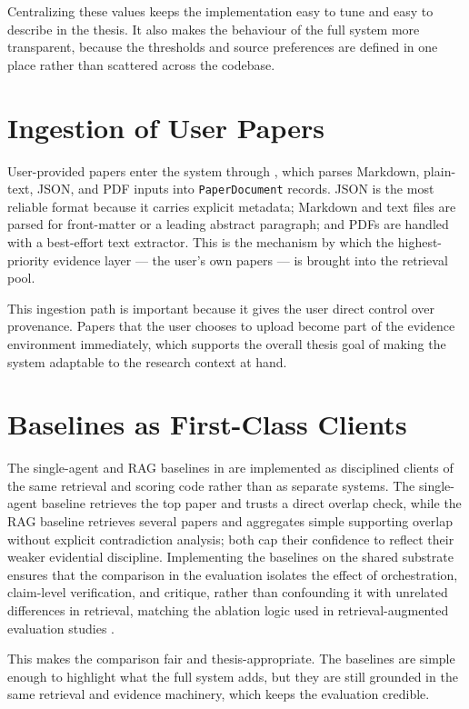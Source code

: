 Centralizing these values keeps the implementation easy to tune and easy to describe in the thesis. It also makes
the behaviour of the full system more transparent, because the thresholds and source preferences are defined in one
place rather than scattered across the codebase.

\section{Ingestion of User Papers }

User-provided papers enter the system through , which parses Markdown, plain-text, JSON, and PDF
inputs into \texttt{PaperDocument} records. JSON is the most reliable format because it carries explicit metadata;
Markdown and text files are parsed for front-matter or a leading abstract paragraph; and PDFs are handled with a
best-effort text extractor. This is the mechanism by which the highest-priority evidence layer --- the user's own
papers --- is brought into the retrieval pool.

This ingestion path is important because it gives the user direct control over provenance. Papers that the user
chooses to upload become part of the evidence environment immediately, which supports the overall thesis goal of
making the system adaptable to the research context at hand.

\section{Baselines as First-Class Clients }

The single-agent and RAG baselines in  are implemented as disciplined clients of the same
retrieval and scoring code rather than as separate systems. The single-agent baseline retrieves the top paper and
trusts a direct overlap check, while the RAG baseline retrieves several papers and aggregates simple supporting
overlap without explicit contradiction analysis; both cap their confidence to reflect their weaker evidential
discipline. Implementing the baselines on the shared substrate ensures that the comparison in the evaluation
isolates the effect of orchestration, claim-level verification, and critique, rather than confounding it with
unrelated differences in retrieval, matching the ablation logic used in retrieval-augmented evaluation studies
\cite{petroni2020kilt,thakur2021beir,ragsurvey2024}.

This makes the comparison fair and thesis-appropriate. The baselines are simple enough to highlight what the full
system adds, but they are still grounded in the same retrieval and evidence machinery, which keeps the evaluation
credible.

